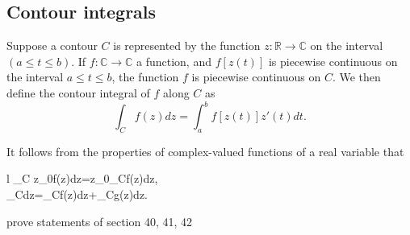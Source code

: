 \documentclass{article}
\begin{document}
\subsection{Contour integrals}
Suppose a contour \(C\) is represented by the function \(z:\mathbb{R}\rightarrow\mathbb{C}\) on the interval \((a\leq t\leq b)\). If \(f:\mathbb{C}\rightarrow\mathbb{C}\) a function, and \(f[z(t)]\) is piecewise continuous on the interval \(a\leq t\leq b\), the function \(f\) is piecewise continuous on \(C\). We then define the contour integral of \(f\) along \(C\) as
\begin{equation*}
	\int_{C}f(z)dz=\int_a^b f[z(t)]z'(t)dt.
\end{equation*}
\begin{proposition}
	It follows from the properties of complex-valued functions of a real variable that
	\begin{IEEEeqnarray*}{l}
		\int_C z_0f(z)dz=z_0\int_Cf(z)dz,\\
		\int_C\big[f(z)+g(z)\big]dz=\int_Cf(z)dz+\int_Cg(z)dz.
	\end{IEEEeqnarray*}
\end{proposition}
\begin{remark}
	prove statements of section 40, 41, 42
\end{remark}
\begin{proposition}
\end{proposition}
\end{document}
